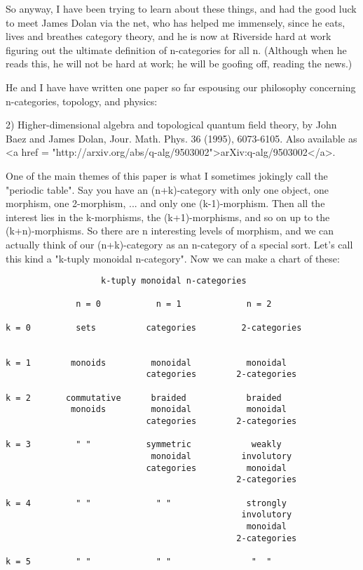 So anyway, I have been trying to learn about these things, and
had the good luck to meet James Dolan via the net, who has
helped me immensely, since he eats, lives and breathes category theory,
and he is now at Riverside hard at work figuring out the ultimate 
definition of n-categories for all n.   (Although when he reads this,
he will not be hard at work; he will be goofing off, reading the news.)

He and I have have written one paper so far espousing our philosophy
concerning n-categories, topology, and physics:

2) Higher-dimensional algebra and topological quantum field theory,
by John Baez and James Dolan, Jour. Math. Phys. 36 (1995), 6073-6105. 
Also available as
<a href = "http://arxiv.org/abs/q-alg/9503002">arXiv:q-alg/9503002</a>.

One of the main themes of this paper is what I sometimes jokingly call
the "periodic table".  Say you have an (n+k)-category with only one
object, one morphism, one 2-morphism, ... and only one (k-1)-morphism.
Then all the interest lies in the k-morphisms, the (k+1)-morphisms,
and so on up to the (k+n)-morphisms.  So there are n interesting
levels of morphism, and we can actually think of our (n+k)-category as
an n-category of a special sort.  Let's call this kind a "k-tuply
monoidal n-category".  Now we can make a chart of these:


\begin{verbatim}
                   k-tuply monoidal n-categories 

              n = 0           n = 1             n = 2

k = 0         sets          categories         2-categories
     

k = 1        monoids         monoidal           monoidal
                            categories        2-categories

k = 2       commutative      braided            braided
             monoids         monoidal           monoidal
                            categories        2-categories 

k = 3         " "           symmetric            weakly
                             monoidal          involutory
                            categories          monoidal
                                              2-categories

k = 4         " "             " "               strongly 
                                               involutory
                                                monoidal
                                              2-categories

k = 5         " "             " "                "  "
\end{verbatim}
    

